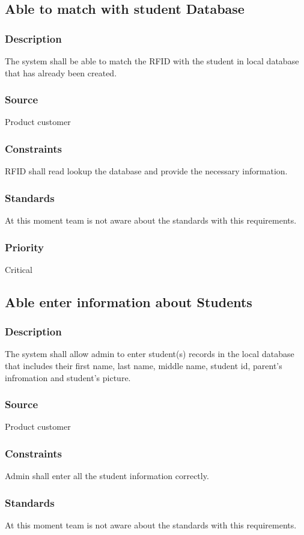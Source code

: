 

\subsection{Able to match with student Database}
\subsubsection{Description}
The system shall be able to match the RFID with the student in local database that has already been created.
\subsubsection{Source}
Product customer
\subsubsection{Constraints}
RFID shall read lookup the database and provide the necessary information.
\subsubsection{Standards}
At this moment team is not aware about the standards with this requirements.
\subsubsection{Priority}
Critical




\subsection{Able enter information about Students}
\subsubsection{Description}
The system shall allow admin to enter student(s) records in the local database that includes their first name, last name, middle name, student id, parent's infromation and student's picture. 
\subsubsection{Source}
Product customer
\subsubsection{Constraints}
Admin shall enter all the student information correctly.
\subsubsection{Standards}
At this moment team is not aware about the standards with this requirements.
